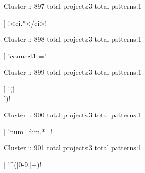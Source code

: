 Cluster i: 897
total projects:3
total patterns:1
\begin{multicols}{1}
\begin{description}[noitemsep,topsep=0pt]
\item [[3] ] \cverb!<ci.*</ci>!
\end{description}
\end{multicols}







Cluster i: 898
total projects:3
total patterns:1
\begin{multicols}{1}
\begin{description}[noitemsep,topsep=0pt]
\item [[3] ] \cverb!connect1 =!
\end{description}
\end{multicols}







Cluster i: 899
total projects:3
total patterns:1
\begin{multicols}{1}
\begin{description}[noitemsep,topsep=0pt]
\item [[3] ] \cverb!(\"|\\')!
\end{description}
\end{multicols}







Cluster i: 900
total projects:3
total patterns:1
\begin{multicols}{1}
\begin{description}[noitemsep,topsep=0pt]
\item [[3] ] \cverb!num_dim.*=!
\end{description}
\end{multicols}







Cluster i: 901
total projects:3
total patterns:1
\begin{multicols}{1}
\begin{description}[noitemsep,topsep=0pt]
\item [[3] ] \cverb!^([0-9.]+)!
\end{description}
\end{multicols}







